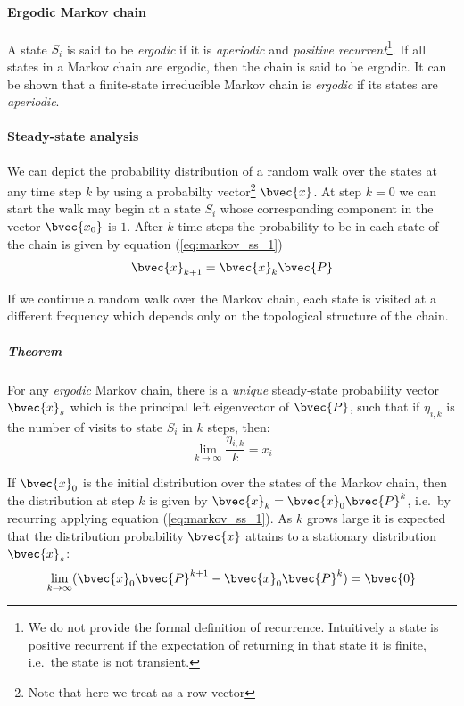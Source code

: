 \paragraph{Ergodic Markov chain} A state $S_i$ is said to be \textit{ergodic} if it is \textit{aperiodic} and \textit{positive recurrent}\footnote{We do not provide the formal definition of recurrence. Intuitively a state is positive recurrent if the expectation of returning in that state it is finite, i.e.\ the state is not transient.}. If all states in a Markov chain are ergodic, then the chain is said to be ergodic. It can be shown that a finite-state irreducible Markov chain is \textit{ergodic} if its states are \textit{aperiodic}.

\paragraph{Steady-state analysis} We can depict the probability distribution of a random walk over the states at any time step $k$ by using a probabilty vector\footnote{Note that here we treat  as a row vector} $\bvec{x}$. At step $k=0$ we can start the walk may begin at a state $S_i$ whose corresponding component in the vector $\bvec{x_0}$ is $1$. After $k$ time steps the probability to be in each state of the chain is given by equation (\ref{eq:markov_ss_1})
\begin{equation}\label{eq:markov_ss_1}
 \bvec{x}_{k+1} = \bvec{x}_k \bvec{P}
\end{equation}

If we continue a random walk over the Markov chain, each state is visited at a different frequency which depends only on the topological structure of the chain. 

\subparagraph{Theorem}For any \textit{ergodic} Markov chain, there is a \textit{unique} steady-state probability vector $\bvec{x}_s$ which is the principal left eigenvector of $\bvec{P}$, such that if $\eta_{i,k}$ is the number of visits to state $S_i$ in $k$ steps, then:
\begin{equation}
 \lim_{k \rightarrow \infty} \dfrac{\eta_{i,k}}{k} = x_{i}
\end{equation}

If $\bvec{x}_0$ is the initial distribution over the states of the Markov chain, then the distribution at step $k$ is given by $\bvec{x}_k = \bvec{x}_0 \bvec{P}^k $, i.e.\ by recurring applying equation (\ref{eq:markov_ss_1}). As $k$ grows large it is expected that the distribution probability $\bvec{x}$ attains to a stationary distribution $\bvec{x}_s$:
\begin{equation}\label{eq:markov_limits}
\lim_{k \rightarrow \infty} (\bvec{x}_0 \bvec{P}^{k+1} - \bvec{x}_0 \bvec{P}^k )= \bvec{0}
\end{equation}

